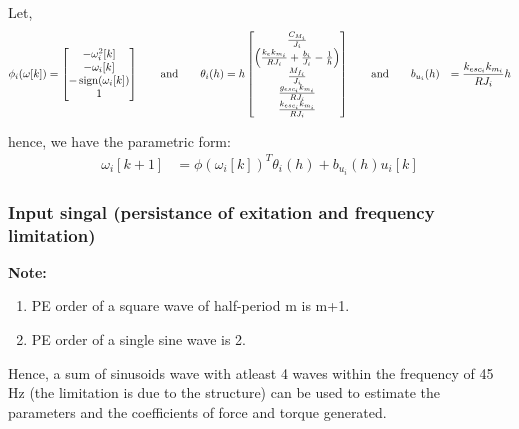 Let,
\begin{align*}
    \phi_i(\omega[k]) &=
    \begin{bmatrix}
        - \omega_i^2[k] \\
        - \omega_i[k]\\
        - \operatorname{sign}(\omega_i[k])\\
        1
    \end{bmatrix}
    \qquad \text{and} \qquad
    \theta_i(h) = h
    \begin{bmatrix}
        \frac{C_{M_i}}{J_i} \\
        \left(\frac{k_ek_{m_i}}{R J_i} + \frac{b_i}{J_i} - \frac{1}{h}\right) \\
        \frac{M_{f_i}}{J_i}\\
        \frac{g_{esc_i}k_{m_i}}{R J_i}\\
        \frac{k_{esc_i}k_{m_i}}{R J_i}
    \end{bmatrix}
    \qquad \text{and} \qquad
    b_{u_i}(h) &=  \frac{k_{esc_i}k_{m_i}}{R J_i}  h
\end{align*}

hence, we have the parametric form:
\begin{align*}
    \omega_i[k+1] &= \phi(\omega_i[k])^T \theta_i(h) + b_{u_i}(h) u_i[k]
\end{align*}

\subsubsection{Input singal (persistance of exitation and frequency limitation)}
\textbf{Note:}
\begin{enumerate}
    \item PE order of a square wave of half-period m is m+1.
    \item PE order of a single sine wave is 2.
\end{enumerate}
Hence, a sum of sinusoids wave with atleast 4 waves within the frequency of 45 Hz (the limitation is due to the structure) can be used to estimate the parameters and the coefficients of force and torque generated.
